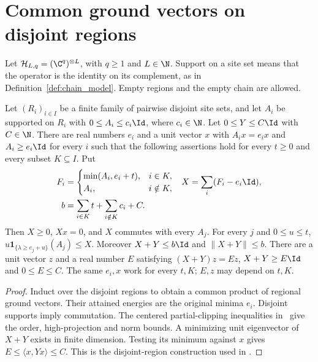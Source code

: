 \section{Common ground vectors on disjoint regions}

Let $\mathcal H_{L,q}=(\C^q)^{\otimes L}$, with $q\ge1$ and $L\in\N$.
Support on a site set means that the operator is the identity on its
complement, as in Definition~\ref{def:chain_model}. Empty regions and the
empty chain are allowed.

\begin{lemma}
    \label{thm:disjoint_regional_clipping}
    \leanok
    Let $(R_i)_{i\in I}$ be a finite family of pairwise disjoint site sets,
    and let $A_i$ be supported on $R_i$ with $0\le A_i\le c_i\Id$,
    where $c_i\in\N$. Let $0\le Y\le C\Id$ with $C\in\N$.
    There are real numbers $e_i$ and a unit vector $x$ with
    $A_ix=e_ix$ and $A_i\ge e_i\Id$ for every $i$ such that the following
    assertions hold for every $t\ge0$ and every subset $K\subseteq I$.
    Put
    \begin{align}
        F_i & =\begin{cases}\min(A_i,e_i+t),&i\in K,\\A_i,&i\notin K,\end{cases}
            & X                                                                  & =\sum_i(F_i-e_i\Id),\notag \\
        b   & =\sum_{i\in K}t+\sum_{i\notin K}c_i+C.
    \end{align}
    Then $X\ge0$, $Xx=0$, and $X$ commutes with every $A_j$.
    For every $j$ and $0\le u\le t$,
    $u\mathbf1_{\{\lambda\ge e_j+u\}}(A_j)\le X$.
    Moreover $X+Y\le b\Id$ and $\|X+Y\|\le b$.
    There are a unit vector $z$ and a real number $E$ satisfying
    $(X+Y)z=Ez$, $X+Y\ge E\Id$ and $0\le E\le C$.
    The same $e_i,x$ work for every $t,K$; $E,z$ may depend on $t,K$.
\end{lemma}
\begin{proof}
    \leanok
    Induct over the disjoint regions to obtain a common product of regional
    ground vectors. Their attained energies are the original minima $e_i$.
    Disjoint supports imply commutation. The centered partial-clipping
    inequalities in~\cite[``Centered partial clipping of a finite family'']
    {QICLean2026Blueprint} give the order, high-projection and norm bounds.
    A minimizing unit eigenvector of $X+Y$ exists in finite dimension.
    Testing its minimum against $x$ gives $E\le\langle x,Yx\rangle\le C$.
    This is the disjoint-region construction used in
    \cite[lines 873--886 and 979--1005]{Arad2016RigorousRG}.
\end{proof}
